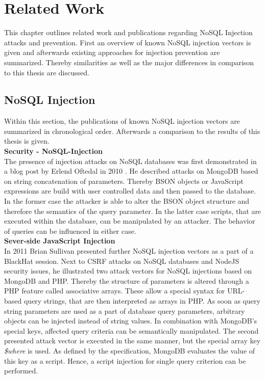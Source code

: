 \chapter{Related Work}
This chapter outlines related work and publications regarding NoSQL Injection attacks and prevention. First an overview of known NoSQL injection vectors is given and afterwards existing approaches for injection prevention are summarized. Thereby similarities as well as the major differences in comparison to this thesis are discussed.

\section{NoSQL Injection}
Within this section, the publications of known NoSQL injection vectors are summarized in chronological order. Afterwards a comparison to the results of this thesis is given. \\

\textbf{Security - NoSQL-Injection}\cite{Oftedal:2010} \\
The presence of injection attacks on NoSQL databases was first demonstrated in a blog post by Erlend Oftedal in 2010 \cite{Oftedal:2010}. He described attacks on MongoDB based on string concatenation of parameters. Thereby BSON objects or JavaScript expressions are build with user controlled data and then passed to the database. In the former case the attacker is able to alter the BSON object structure and therefore the semantics of the query parameter. In the latter case scripts, that are executed within the database, can be manipulated by an attacker. The behavior of queries can be influenced in either case. \\

\textbf{Sever-side JavaScript Injection}\cite{Sullivan:2011} \\
In 2011 Brian Sullivan presented further NoSQL injection vectors as a part of a BlackHat session. Next to CSRF attacks on NoSQL databases and NodeJS security issues, he illustrated two attack vectors for NoSQL injections based on MongoDB and PHP. Thereby the structure of parameters is altered through a PHP feature called associative arrays. These allow a special syntax for URL-based query strings, that are then interpreted as arrays in PHP. As soon as query string parameters are used as a part of database query parameters, arbitrary objects can be injected instead of string values. In combination with MongoDB's special keys, affected query criteria can be semantically manipulated. The second presented attack vector is executed in the same manner, but the special array key \textit{\$where} is used. As defined by the specification, MongoDB evaluates the value of this key as a script. Hence, a script injection for single query criterion can be performed. \\

